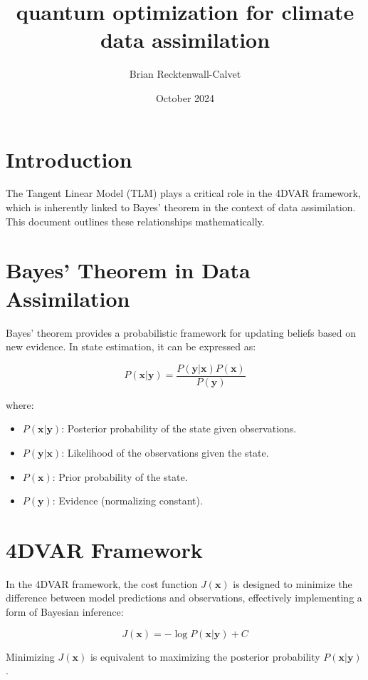 \documentclass{article}
\title{quantum optimization for climate data assimilation}
\author{Brian Recktenwall-Calvet}
\date{October 2024}
\begin{document}
\maketitle

\section{Introduction}

The Tangent Linear Model (TLM) plays a critical role in the 4DVAR framework, which is inherently linked to Bayes' theorem in the context of data assimilation. This document outlines these relationships mathematically.

\section{Bayes' Theorem in Data Assimilation}

Bayes' theorem provides a probabilistic framework for updating beliefs based on new evidence. In state estimation, it can be expressed as:

\[
P(\mathbf{x} | \mathbf{y}) = \frac{P(\mathbf{y} | \mathbf{x}) P(\mathbf{x})}{P(\mathbf{y})}
\]

where:
\begin{itemize}
    \item \( P(\mathbf{x} | \mathbf{y}) \): Posterior probability of the state given observations.
    \item \( P(\mathbf{y} | \mathbf{x}) \): Likelihood of the observations given the state.
    \item \( P(\mathbf{x}) \): Prior probability of the state.
    \item \( P(\mathbf{y}) \): Evidence (normalizing constant).
\end{itemize}

\section{4DVAR Framework}

In the 4DVAR framework, the cost function \( J(\mathbf{x}) \) is designed to minimize the difference between model predictions and observations, effectively implementing a form of Bayesian inference:

\[
J(\mathbf{x}) = -\log P(\mathbf{x} | \mathbf{y}) + C
\]

Minimizing \( J(\mathbf{x}) \) is equivalent to maximizing the posterior probability \( P(\mathbf{x} | \mathbf{y}) \).
\end{document}
